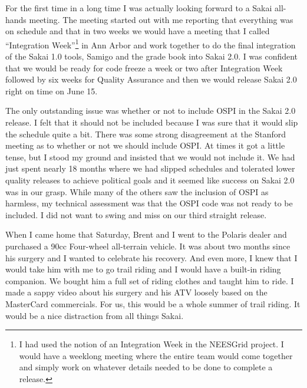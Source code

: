 \documentclass[12pt]{book}
\begin{document}
For the first time in a long time I was actually
looking forward to a Sakai all-hands meeting.
The meeting started out with me reporting that
everything was on schedule and that in two weeks
we would have a meeting that
I called
``Integration Week''\footnote{I had used
the notion of an Integration Week in the NEESGrid
project.  I would have a weeklong meeting
where the  entire team would come together
and simply work on whatever details needed
to be done to complete a release.}
in Ann Arbor and work together
to do the final integration of the Sakai 1.0
tools, Samigo and the grade book into Sakai 2.0.
I was confident that we would be ready for code
freeze a week or two after Integration
Week followed by six weeks for Quality
Assurance and then we would release Sakai
2.0 right on time on June 15.

\begin{sloppypar}
The only outstanding issue was whether or not
to include OSPI in the Sakai 2.0 release.
I felt that it should not be included
because  I was sure that it would slip
the schedule quite a bit.
There was some strong disagreement at the Stanford
meeting as to whether or not we should include OSPI.
At times it got a little tense, but I stood my ground
and insisted that we would not include it.
We had just spent nearly 18 months where we
had slipped schedules and tolerated lower
quality releases to achieve political
goals and it seemed like success on Sakai 2.0 was in
our grasp. While many of the others saw
the inclusion of OSPI as harmless, my technical
assessment was that the OSPI code was not
ready to be included.  I did not want to
swing and miss on our third straight release.
\end{sloppypar}

When I came home that Saturday, Brent and
I went to the Polaris dealer and purchased a 90cc
Four-wheel all-terrain vehicle.  It was about
two months since his surgery and I wanted
to celebrate his recovery.  And even more,
I knew that I would take him with me to go
trail riding and I would have a built-in
riding companion.  We bought him a full set of
riding clothes and taught him to ride.
I made a sappy video about his surgery and his ATV
loosely based on the MasterCard commercials.
For us, this would be a whole summer of trail riding.
It would be a nice distraction from all things
Sakai.
\end{document}
